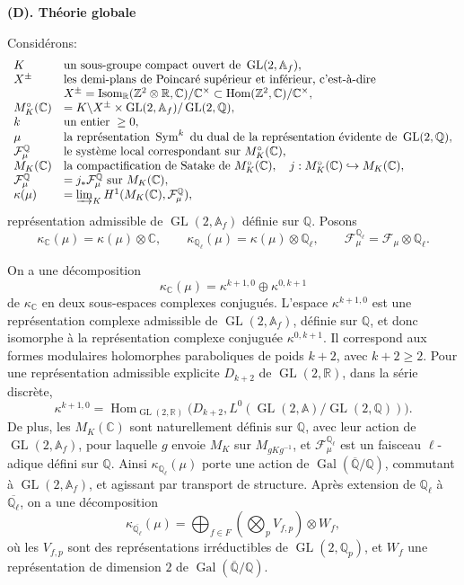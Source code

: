 \documentclass[11pt]{article}
\newcommand{\Q}{\mathbb{Q}}
\newcommand{\Z}{\mathbb{Z}}
\newcommand{\C}{\mathbb{C}}
\newcommand{\Qp}{\mathbb{Q}_{p}}
\newcommand{\Ql}{\mathbb{Q}_{\ell}}
\newcommand{\Af}{\mathbb{A}_{f}}
\newcommand{\Gal}{\operatorname{Gal}}
\newcommand{\Hom}{\operatorname{Hom}}
\newcommand{\Isom}{\operatorname{Isom}}
\newcommand{\GL}{\operatorname{GL}}
\newcommand{\Sym}{\operatorname{Sym}}
\newcommand{\Lim}{\varinjlim}
\begin{document}
\begin{center}
\textbf{(D). Théorie globale}
\end{center}

Considérons:
\[
\begin{array}{ll}
K & \text{un sous-groupe compact ouvert de }\GL(2,\Af),\\
X^{\pm} & \text{les demi-plans de Poincaré supérieur et inférieur, c'est-à-dire}\\
& X^{\pm}=\Isom_{\mathbb R}(\Z^2\otimes\mathbb R,\C)/\C^{\times}
\subset\Hom(\Z^2,\C)/\C^{\times},\\
M_K^{\circ}(\C) & =K\backslash X^{\pm}\times\GL(2,\Af)/\GL(2,\Q),\\
k & \text{un entier } \geq0,\\
\mu & \text{la représentation }\Sym^k\text{ du dual de la représentation évidente de }\GL(2,\Q),\\
\mathcal F_{\mu}^{\Q} & \text{le système local correspondant sur }M_K^{\circ}(\C),\\
M_K(\C) & \text{la compactification de Satake de }M_K^{\circ}(\C),\quad
j:M_K^{\circ}(\C)\hookrightarrow M_K(\C),\\
\mathcal F_{\mu}^{\Q} & =j_*\mathcal F_{\mu}^{\Q}\text{ sur }M_K(\C),\\
\kappa(\mu) & =\Lim_K H^1(M_K(\C),\mathcal F_{\mu}^{\Q}),
\end{array}
\]
représentation admissible de \(\GL(2,\Af)\) définie sur \(\Q\). Posons
\[
\kappa_{\C}(\mu)=\kappa(\mu)\otimes\C,\qquad
\kappa_{\Ql}(\mu)=\kappa(\mu)\otimes\Ql,\qquad
\mathcal F_{\mu}^{\Ql}=\mathcal F_{\mu}\otimes\Ql .
\]

On a une décomposition
\[
\kappa_{\C}(\mu)=\kappa^{k+1,0}\oplus\kappa^{0,k+1}
\]
de \(\kappa_{\C}\) en deux sous-espaces complexes conjugués. L'espace \(\kappa^{k+1,0}\) est une représentation complexe admissible de \(\GL(2,\Af)\), définie sur \(\Q\), et donc isomorphe à la représentation complexe conjuguée \(\kappa^{0,k+1}\). Il correspond aux formes modulaires holomorphes paraboliques de poids \(k+2\), avec \(k+2\geq2\). Pour une représentation admissible explicite \(D_{k+2}\) de \(\GL(2,\mathbb R)\), dans la série discrète,
\[
\kappa^{k+1,0}=
\Hom_{\GL(2,\mathbb R)}
\bigl(D_{k+2},L^0(\GL(2,\mathbb A)/\GL(2,\Q))\bigr).
\]
De plus, les \(M_K(\C)\) sont naturellement définis sur \(\Q\), avec leur action de \(\GL(2,\Af)\), pour laquelle \(g\) envoie \(M_K\) sur \(M_{gKg^{-1}}\), et \(\mathcal F_{\mu}^{\Ql}\) est un faisceau \(\ell\)-adique défini sur \(\Q\). Ainsi \(\kappa_{\Ql}(\mu)\) porte une action de \(\Gal(\overline{\Q}/\Q)\), commutant à \(\GL(2,\Af)\), et agissant par transport de structure. Après extension de \(\Ql\) à \(\overline{\Ql}\), on a une décomposition
\[
\kappa_{\overline{\Ql}}(\mu)=
\bigoplus_{f\in F}\left(\bigotimes_p V_{f,p}\right)\otimes W_f,
\]
où les \(V_{f,p}\) sont des représentations irréductibles de \(\GL(2,\Qp)\), et \(W_f\) une représentation de dimension \(2\) de \(\Gal(\overline{\Q}/\Q)\).
\end{document}
